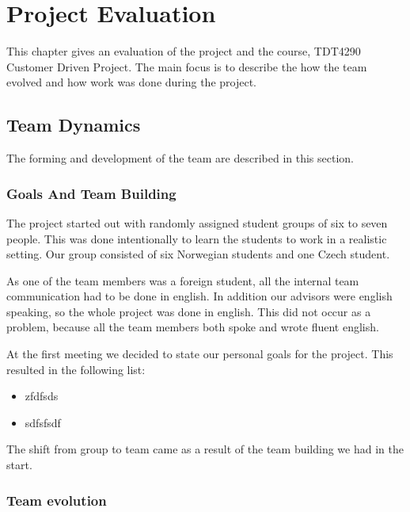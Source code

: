 \chapter{Project Evaluation}
This chapter gives an evaluation of the project and the course, TDT4290 Customer Driven Project. The main focus is to describe the how the team evolved and how work was done during the project.   

\section{Team Dynamics}
The forming and development of the team are described in this section.
\subsection{Goals And Team Building}
The project started out with randomly assigned student groups of six to seven people. This was done intentionally to learn the students to work in a realistic setting. Our group consisted of six Norwegian students and one Czech student. 

As one of the team members was a foreign student, all the internal team communication had to be done in english. In addition our advisors were english speaking, so the whole project was done in english. This did not occur as a problem, because all the team members both spoke and wrote fluent english.

At the first meeting we decided to state our personal goals for the project. This resulted in the following list:
\begin{itemize}
\item zfdfsds
\item sdfsfsdf
\end{itemize}


The shift from group to team came as a result of the team building we had in the start. 


\subsection{Team evolution}




